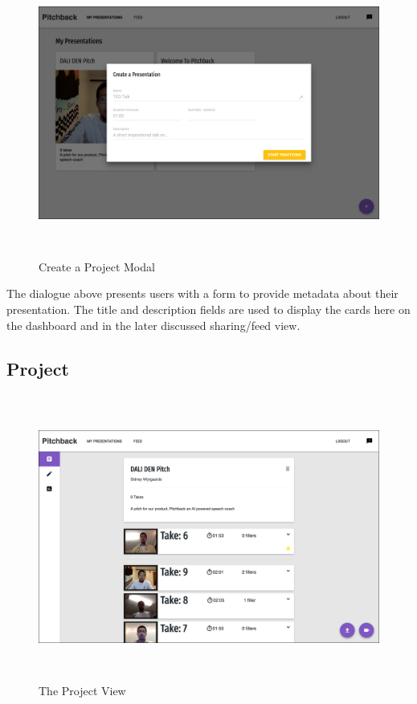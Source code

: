 \begin{figure}[H]
  \centering
   \includegraphics[height=3.7in]{figures/create}
   \caption{Create a Project Modal}
\end{figure}

The dialogue above presents users with a form to provide metadata about their
presentation. The title and description fields are used to display the cards
here on the dashboard and in the later discussed sharing/feed view. 

\subsection*{Project}

\begin{figure}[H]
  \centering
   \includegraphics[height=3.7in]{figures/project_collapsed}
   \caption{The Project View}
\end{figure}

